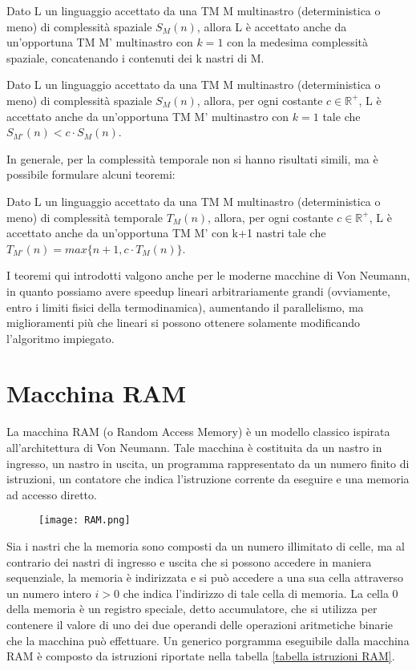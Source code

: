   \begin{theorem}
    Dato L un linguaggio accettato da una TM M multinastro (deterministica o meno) di complessità spaziale \({S}_M(n)\), allora L è accettato anche da un'opportuna TM M' multinastro con \(k=1\) con la medesima complessità spaziale, concatenando i contenuti dei k nastri di M.
  \end{theorem}

  \begin{theorem}
    Dato L un linguaggio accettato da una TM M multinastro (deterministica o meno) di complessità spaziale \({S}_M(n)\), allora, per ogni costante \(c\in \mathbb{R}^+\), L è accettato anche da un'opportuna TM M' multinastro con \(k=1\) tale che \({S}_{M'}(n)<c\cdot{S}_M(n)\).
  \end{theorem}

  In generale, per la complessità temporale non si hanno risultati simili, ma è possibile formulare alcuni teoremi:

  \begin{theorem}
    Dato L un linguaggio accettato da una TM M multinastro (deterministica o meno) di complessità temporale \({T}_M(n)\), allora, per ogni costante \(c\in \mathbb{R}^+\), L è accettato anche da un'opportuna TM M' con k+1 nastri tale che \({T}_{M'}(n) = max\{n+1, c\cdot{T}_M(n)\}\).    
  \end{theorem}

  I teoremi qui introdotti valgono anche per le moderne macchine di Von Neumann, in quanto possiamo avere speedup lineari arbitrariamente grandi (ovviamente, entro i limiti fisici della termodinamica), aumentando il parallelismo, ma miglioramenti più che lineari si possono ottenere solamente modificando l'algoritmo impiegato. 

  \section{Macchina RAM}
  La macchina RAM (o Random Access Memory) è un modello classico ispirata all'architettura di Von Neumann. Tale macchina è costituita da un nastro in ingresso, un nastro in uscita, un programma rappresentato da un numero finito di istruzioni, un contatore che indica l'istruzione corrente da eseguire e una memoria ad accesso diretto.

  \begin{figure}[h]
    \texttt{[image: RAM.png]}
  \end{figure}

  Sia i nastri che la memoria sono composti da un numero illimitato di celle, ma al contrario dei nastri di ingresso e uscita che si possono accedere in maniera sequenziale, la memoria è indirizzata e si può accedere a una sua cella attraverso un numero intero \(i>0\) che indica l'indirizzo di tale cella di memoria. La cella 0 della memoria è un registro speciale, detto accumulatore, che si utilizza per contenere il valore di uno dei due operandi delle operazioni aritmetiche binarie che la macchina può effettuare. Un generico porgramma eseguibile dalla macchina RAM è composto da istruzioni riportate nella tabella \ref{tabella istruzioni RAM}.

